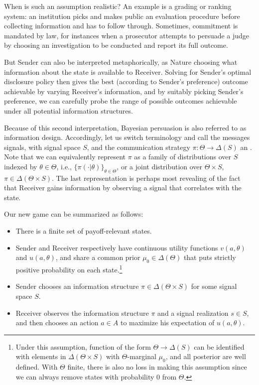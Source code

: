 When is such an assumption realistic?
An example is a grading or ranking system: an institution picks and makes public an evaluation procedure before collecting information and has to follow through.
Sometimes, commitment is mandated by law, for instances when a prosecutor attempts to persuade a judge by choosing an investigation to be conducted and report its full outcome.

But Sender can also be interpreted metaphorically, as Nature choosing what information about the state is available to Receiver.
Solving for Sender's optimal disclosure policy then gives the best (according to Sender's preference) outcome achievable by varying Receiver's information, and by suitably picking Sender's preference, we can carefully probe the range of possible outcomes achievable under all potential information structures.

Because of this second interpretation, Bayesian persuasion is also referred to as information design.
Accordingly, let us switch terminology and call the messages signals, with signal space \(S\), and the communication strategy \(\pi : \Theta \to \Delta(S)\) an .
Note that we can equivalently represent \(\pi\) as a family of distributions over \(S\) indexed by \(\theta \in \Theta\), i.e., \(\{\pi(\cdot | \theta)\}_{\theta \in \Theta}\), or a joint distribution over \(\Theta \times S\), \(\pi \in \Delta(\Theta \times S)\).
The last representation is perhaps most revealing of the fact that Receiver gains information by observing a signal that correlates with the state.

Our new game can be summarized as follows:
\begin{itemize}
  \item There is a finite set of payoff-relevant states.
  \item Sender and Receiver respectively have continuous utility functions \(v(a, \theta)\) and \(u(a, \theta)\), and share a common prior \(\mu_0 \in \Delta(\Theta)\) that puts strictly positive probability on each state.\footnote{
      Under this assumption, function of the form \(\Theta \to \Delta(S)\) can be identified with elements in \(\Delta(\Theta \times S)\) with \(\Theta\)-marginal \(\mu_0\), and all posterior are well defined.
      With \(\Theta\) finite, there is also no loss in making this assumption since we can always remove states with probability \(0\) from \(\Theta\).
    }
  \item Sender chooses an information structure \(\pi \in \Delta(\Theta \times S)\) for some signal space \(S\).
  \item Receiver observes the information structure \(\pi\) and a signal realization \(s \in S\), and then chooses an action \(a \in A\) to maximize his expectation of \(u(a, \theta)\).
\end{itemize}

